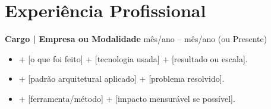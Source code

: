 \documentclass[a4paper,10pt]{article}
\begin{document}
\section*{Experiência Profissional}

%

\textbf{Cargo | Empresa ou Modalidade} \hfill mês/ano -- mês/ano (ou Presente) \\

\begin{itemize}[leftmargin=*, noitemsep]
  \item [Verbo de ação] + [o que foi feito] + [tecnologia usada] + [resultado ou escala].
  \item [Verbo de ação] + [padrão arquitetural aplicado] + [problema resolvido].
  \item [Verbo de ação] + [ferramenta/método] + [impacto mensurável se possível].
\end{itemize}

\vspace{4pt}



%
%
%
\end{document}

